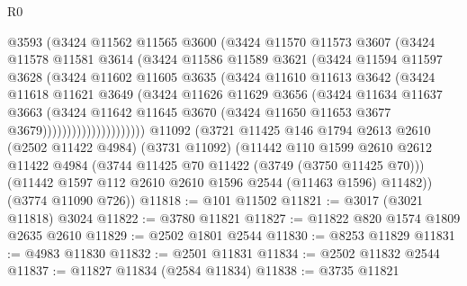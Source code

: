 \begin{lexlean}{R0}
\begin{coremodule}
                      @3593
                      (@3424
                        @11562
                        @11565
                        @3600
                        (@3424
                          @11570
                          @11573
                          @3607
                          (@3424
                            @11578
                            @11581
                            @3614
                            (@3424
                              @11586
                              @11589
                              @3621
                              (@3424
                                @11594
                                @11597
                                @3628
                                (@3424
                                  @11602
                                  @11605
                                  @3635
                                  (@3424
                                    @11610
                                    @11613
                                    @3642
                                    (@3424
                                      @11618
                                      @11621
                                      @3649
                                      (@3424
                                        @11626
                                        @11629
                                        @3656
                                        (@3424
                                          @11634
                                          @11637
                                          @3663
                                          (@3424
                                            @11642
                                            @11645
                                            @3670
                                            (@3424 @11650 @11653 @3677 @3679)))))))))))))))))))))
    @11092
    (@3721
      @11425
      @146
      @1794
      @2613
      @2610
      (@2502 @11422 @4984)
      (@3731 @11092)
      (@11442
        @110
        @1599
        @2610
        @2612
        @11422
        @4984
        (@3744 @11425 @70 @11422 (@3749 (@3750 @11425 @70)))
        (@11442 @1597 @112 @2610 @2610 @1596 @2544 (@11463 @1596) @11482))
      (@3774 @11090 @726))
@11818 := @101 @11502
@11821 := @3017 (@3021 @11818) @3024
@11822 := @3780 @11821
@11827 := @11822 @820 @1574 @1809 @2635 @2610
@11829 := @2502 @1801 @2544
@11830 := @8253 @11829
@11831 := @4983 @11830
@11832 := @2501 @11831
@11834 := @2502 @11832 @2544
@11837 := @11827 @11834 (@2584 @11834)
@11838 := @3735 @11821

\end{coremodule}
\end{lexlean}
